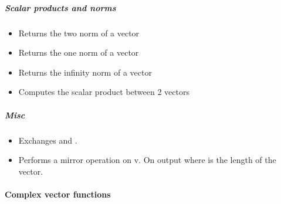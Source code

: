 \subparagraph{Scalar products and norms}
\begin{itemize}
\item {}
  \sshortdescribe Returns the two norm of a vector  

\item {}
  \sshortdescribe Returns the one norm of a vector  

\item {}
  \sshortdescribe Returns the infinity norm of a vector  

\item {} 
  \sshortdescribe Computes the scalar product between 2 vectors  
\end{itemize}

\subparagraph{Misc}

\begin{itemize}
\item {}
  \sshortdescribe Exchanges  and .
\item {}
  \sshortdescribe Performs a mirror operation on v. On output  where  is the length of the vector.
\end{itemize}


\paragraph{Complex vector functions}


